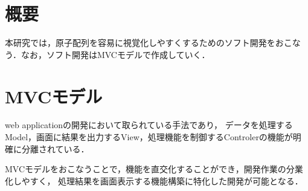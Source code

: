 
\section{概要}
本研究では，原子配列を容易に視覚化しやすくするためのソフト開発をおこなう．なお，ソフト開発はMVCモデルで作成していく．

\section{MVCモデル}
web applicationの開発において取られている手法であり，
データを処理するModel，画面に結果を出力するView，処理機能を制御するControlerの機能が明確に分離されている．

MVCモデルをおこなうことで，機能を直交化することができ，開発作業の分業化しやすく， 処理結果を画面表示する機能構築に特化した開発が可能となる．

